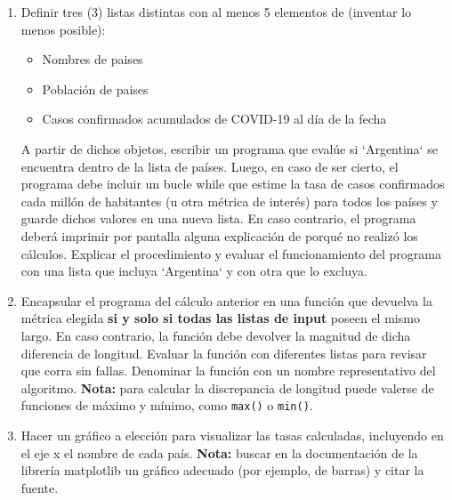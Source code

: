 \documentclass[a4paper,11pt]{article}
\begin{document}
\begin{enumerate}
		\item Definir tres (3) listas distintas con al menos 5 elementos de (inventar lo menos posible):
		    \begin{itemize}
		        \item Nombres de paises
		        \item Población de paises
		        \item Casos confirmados acumulados de COVID-19 al día de la fecha  
		    \end{itemize}
        A partir de dichos objetos, escribir un programa que evalúe si `Argentina` se encuentra dentro de la lista de países. Luego, en caso de ser cierto, el programa debe incluir un bucle while que estime la tasa de casos confirmados cada millón de habitantes (u otra métrica de interés) para todos los países y guarde dichos valores en una nueva lista. En caso contrario, el programa deberá imprimir por pantalla alguna explicación de porqué no realizó los cálculos. Explicar el procedimiento y evaluar el funcionamiento del programa con una lista que incluya `Argentina` y con otra que lo excluya.
        \item Encapsular el programa del cálculo anterior en una función que devuelva la métrica elegida \textbf{si y solo si todas las listas de input} poseen el mismo largo. En caso contrario, la función debe devolver la magnitud de dicha diferencia de longitud. Evaluar la función con diferentes listas para revisar que corra sin fallas. Denominar la función con un nombre representativo del algoritmo. \textbf{Nota:} para calcular la discrepancia de longitud puede valerse de funciones de máximo y mínimo, como \texttt{max()} o \texttt{min()}.
        \item Hacer un gráfico a elección para visualizar las tasas calculadas, incluyendo en el eje x el nombre de cada país. \textbf{Nota:} buscar en la documentación de la librería matplotlib un gráfico adecuado (por ejemplo, de barras) y citar la fuente.

\end{enumerate}
\end{document}
